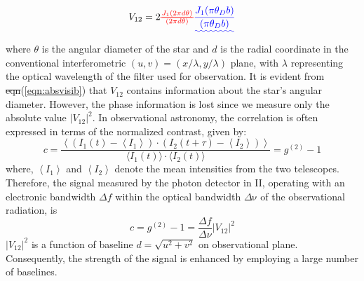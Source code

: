 \documentclass[fleqn,usenatbib,twocolumn]{mnras}
\makeatletter
\newcommand{\abs}[1]{\left|#1\right|}
\providecommand{\DIFadd}[1]{{\protect\color{blue}\uwave{#1}}} %
\providecommand{\DIFdel}[1]{{\protect\color{red}\sout{#1}}} %
\providecommand{\DIFaddbegin}{} %
\providecommand{\DIFaddend}{} %
\providecommand{\DIFdelbegin}{} %
\providecommand{\DIFdelend}{} %
\newcommand{\DIFscaledelfig}{0.5}
\newlength{\DIFdelgraphicswidth} %
\newlength{\DIFdelgraphicsheight} %
\newcommand{\DIFaddincludegraphics}[2][]{{\color{blue}\fbox{\DIFOincludegraphics[#1]{#2}}}} %
\newcommand{\DIFdelincludegraphics}[2][]{%
\sbox{\DIFdelgraphicsbox}{\DIFOincludegraphics[#1]{#2}}%
\settoboxwidth{\DIFdelgraphicswidth}{\DIFdelgraphicsbox} %
\settoboxtotalheight{\DIFdelgraphicsheight}{\DIFdelgraphicsbox} %
\scalebox{\DIFscaledelfig}{%
\parbox[b]{\DIFdelgraphicswidth}{\usebox{\DIFdelgraphicsbox}\\[-\baselineskip] \rule{\DIFdelgraphicswidth}{0em}}\llap{\resizebox{\DIFdelgraphicswidth}{\DIFdelgraphicsheight}{%
\setlength{\unitlength}{\DIFdelgraphicswidth}%
\begin{picture}(1,1)%
\thicklines\linethickness{2pt} %
{\color[rgb]{1,0,0}\put(0,0){\framebox(1,1){}}}%
{\color[rgb]{1,0,0}\put(0,0){\line( 1,1){1}}}%
{\color[rgb]{1,0,0}\put(0,1){\line(1,-1){1}}}%
\end{picture}%
}\hspace*{3pt}}} %
} %
\DeclareRobustCommand{\DIFaddbegin}{\DIFOaddbegin \let\includegraphics\DIFaddincludegraphics} %
\DeclareRobustCommand{\DIFaddend}{\DIFOaddend \let\includegraphics\DIFOincludegraphics} %
\DeclareRobustCommand{\DIFdelbegin}{\DIFOdelbegin \let\includegraphics\DIFdelincludegraphics} %
\DeclareRobustCommand{\DIFdelend}{\DIFOaddend \let\includegraphics\DIFOincludegraphics} %
\let\sout@orig\sout %
\renewcommand{\sout}[1]{\ifmmode\text{\sout@orig{\ensuremath{#1}}}\else\sout@orig{#1}\fi} %
\makeatother
\begin{document}
\begin{equation}
 V_{12} = 2 \DIFdelbegin \DIFdel{\frac{J_1(2 \pi d \theta)}{(2 \pi d \theta)}
}\DIFdelend \DIFaddbegin \DIFadd{\frac{J_1(\pi\theta_D b)}{(\pi\theta_D b)}
}\DIFaddend \label{eqn:absvisib}
\end{equation}
where \DIFdelbegin \DIFdel{$\theta$ }\DIFdelend \DIFaddbegin \DIFadd{$\theta_D$ }\DIFaddend is the angular diameter of the star and \DIFdelbegin \DIFdel{$d$ }\DIFdelend \DIFaddbegin \DIFadd{$b$ }\DIFaddend is the radial coordinate in the conventional interferometric $(u , v) = (x/\lambda, y/\lambda)$ plane, with $\lambda$ representing the optical wavelength of the filter used for observation. It is evident from \DIFdelbegin \DIFdel{eqn}\DIFdelend \DIFaddbegin \DIFadd{eq.~}\DIFaddend (\ref{eqn:absvisib}) that $V_{12}$ contains information about the star's angular diameter. However, the phase information is lost since we measure only the absolute value $\vert V_{12} \vert^2$. In observational astronomy, the correlation is often expressed in terms of the normalized contrast, given by:
\begin{equation}
	c = \frac{\left\langle \left( I_1(t) - \left\langle I_1 \right\rangle \right) \cdot \left( I_2(t + \tau) - \left\langle I_2 \right\rangle \right) \right\rangle}{\langle I_1(t) \rangle \cdot \langle I_2(t) \rangle} = g^{(2)} - 1
\end{equation}
where, $\left\langle I_1 \right\rangle$ and $\left\langle I_2 \right\rangle$ denote the mean intensities from the two telescopes. Therefore, the signal measured by the photon detector in II, operating with an electronic bandwidth $\Delta f$ within the optical bandwidth $\Delta {\mathrm {\nu}}$ of the observational radiation, is
\begin{equation}
	c = g^{(2)} - 1 = \frac{\Delta f}{\Delta \nu} \abs{V_{12}}^2
	\label{eq:signal}
\end{equation}
$\abs{V_{12}}^2$ is a function of baseline $d = \sqrt{u^2 + v^2}$ on observational plane. Consequently, the strength of the signal is enhanced by employing a large number of baselines.
\end{document}
